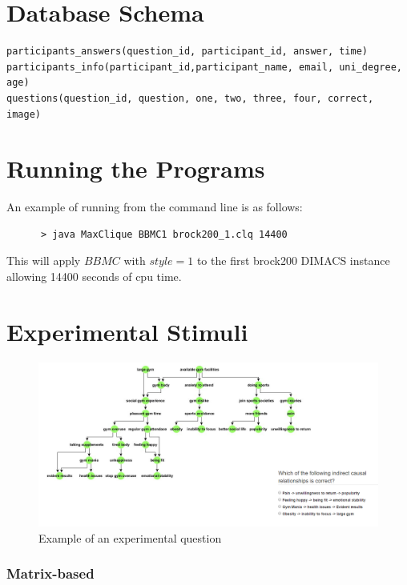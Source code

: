 \documentclass{l4proj}
\begin{document}
\begin{appendices}

\chapter{Database Schema}

\begin{verbatim}
participants_answers(question_id, participant_id, answer, time)
participants_info(participant_id,participant_name, email, uni_degree, age)
questions(question_id, question, one, two, three, four, correct, image)
\end{verbatim}


\chapter{Running the Programs}
An example of running from the command line is as follows:
\begin{verbatim}
      > java MaxClique BBMC1 brock200_1.clq 14400
\end{verbatim}
This will apply $BBMC$ with $style = 1$ to the first brock200 DIMACS instance allowing 14400 seconds of cpu time.


\chapter{Experimental Stimuli}


\begin{figure}
\centering
\includegraphics[width=24cm]{exampleQuestion.PNG}
\caption{Example of an experimental question}
\label{exampleQuestion}
\end{figure}


\subsection{Matrix-based}


\end{appendices}
\end{document}
